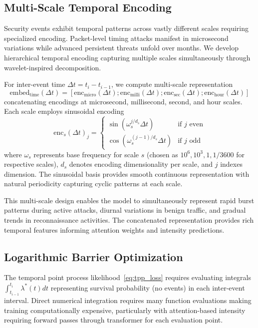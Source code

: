 \documentclass[10pt,journal,compsoc]{IEEEtran}
\begin{document}
\subsection{Multi-Scale Temporal Encoding}

Security events exhibit temporal patterns across vastly different scales requiring specialized encoding. Packet-level timing attacks manifest in microsecond variations while advanced persistent threats unfold over months. We develop hierarchical temporal encoding capturing multiple scales simultaneously through wavelet-inspired decomposition.

For inter-event time $\Delta t = t_i - t_{i-1}$, we compute multi-scale representation
\begin{equation}
\text{embed}_{\text{time}}(\Delta t) = \left[\text{enc}_{\text{micro}}(\Delta t); \text{enc}_{\text{milli}}(\Delta t); \text{enc}_{\text{sec}}(\Delta t); \text{enc}_{\text{hour}}(\Delta t)\right]
\end{equation}
concatenating encodings at microsecond, millisecond, second, and hour scales. Each scale employs sinusoidal encoding
\begin{equation}
\text{enc}_s(\Delta t)_j = \begin{cases}
\sin(\omega_s^{j/d_s} \Delta t) & \text{if } j \text{ even} \\
\cos(\omega_s^{(j-1)/d_s} \Delta t) & \text{if } j \text{ odd}
\end{cases}
\end{equation}
where $\omega_s$ represents base frequency for scale $s$ (chosen as $10^6, 10^3, 1, 1/3600$ for respective scales), $d_s$ denotes encoding dimensionality per scale, and $j$ indexes dimension. The sinusoidal basis provides smooth continuous representation with natural periodicity capturing cyclic patterns at each scale.

This multi-scale design enables the model to simultaneously represent rapid burst patterns during active attacks, diurnal variations in benign traffic, and gradual trends in reconnaissance activities. The concatenated representation provides rich temporal features informing attention weights and intensity predictions.

\subsection{Logarithmic Barrier Optimization}

The temporal point process likelihood~\eqref{eq:tpp_loss} requires evaluating integrals $\int_{t_{i-1}}^{t_i} \lambda^*(t) dt$ representing survival probability (no events) in each inter-event interval. Direct numerical integration requires many function evaluations making training computationally expensive, particularly with attention-based intensity requiring forward passes through transformer for each evaluation point.
\end{document}
